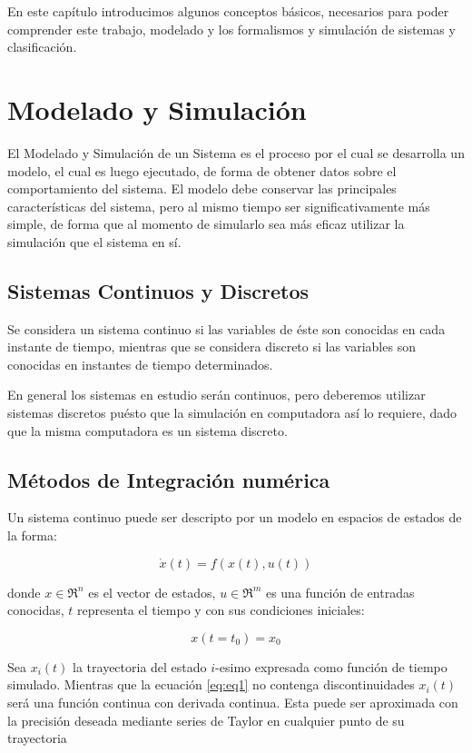 En este capítulo introducimos algunos conceptos básicos, necesarios para poder comprender este trabajo, modelado y los formalismos y simulación de sistemas y clasificación.

\section{Modelado y Simulación}
	El Modelado y Simulación de un Sistema es el proceso por el cual se desarrolla un modelo, el cual es luego ejecutado, de forma de obtener datos 
	sobre el comportamiento del sistema. El modelo debe conservar las principales características del sistema, pero al mismo tiempo ser significativamente 
	más simple, de forma que al momento de simularlo sea más eficaz utilizar la simulación que el sistema en sí.

	\subsection{Sistemas Continuos y Discretos}
	Se considera un sistema continuo si las variables de éste son conocidas en cada instante de tiempo, mientras que se considera discreto si las 
	variables son conocidas en instantes de tiempo determinados.

	En general los sistemas en estudio serán continuos, pero deberemos utilizar sistemas discretos puésto que la simulación en computadora así lo 
	requiere, dado que la misma computadora es un sistema discreto.

	\subsection{Métodos de Integración numérica}
	Un sistema continuo puede ser descripto por un modelo en espacios de estados de la forma:

	\begin{equation} \label{eq:eq1}
	\dot{x}(t) = f (x(t), u(t))
	\end{equation}

	donde $x \in \Re^n$  es el vector de estados, $u \in \Re^m$ es una función de entradas conocidas,
	$t$ representa el tiempo y con sus condiciones iniciales:

	\begin{equation} \label{eq:eq2}
	x(t = t_0 ) = x_0
	\end{equation}

	Sea $x_i (t)$ la trayectoria del estado $i$-esimo expresada como función de tiempo simulado. 
	Mientras que la ecuación  \eqref{eq:eq1} no contenga discontinuidades $x_i (t)$ será una función continua con derivada continua. 
	Esta puede ser aproximada con la precisión deseada mediante series de Taylor en cualquier punto de su trayectoria

